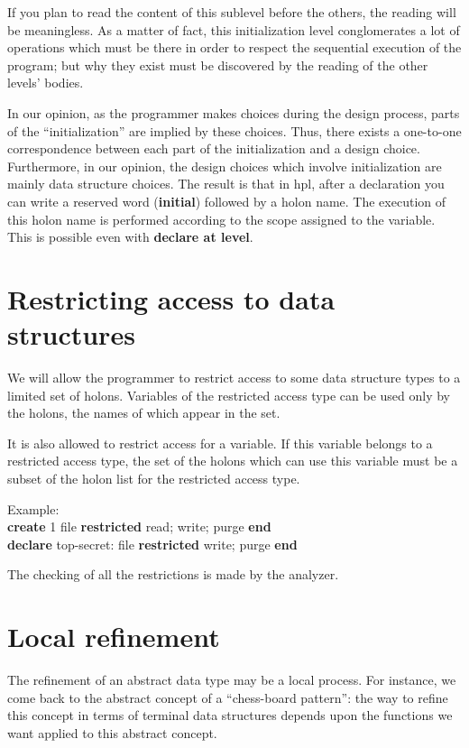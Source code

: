 \documentclass[openany,nobib]{tufte-book}
\newcommand{\kw}[1]{{\bf #1}}
\begin{document}
If you plan to read the content of this sublevel before the others, the reading
will be meaningless. As a matter of fact, this initialization level
conglomerates a lot of operations which must be there in order to respect the
sequential execution of the program; but why they exist must be discovered by
the reading of the other levels' bodies.

In our opinion, as the programmer makes choices during the design process,
parts of the ``initialization'' are implied by these choices. Thus, there
exists a one-to-one correspondence between each part of the initialization and
a design choice. Furthermore, in our opinion, the design choices which involve
initialization are mainly data structure choices. The result is that in {\sc
hpl}, after a declaration you can write a reserved word (\kw{initial})
followed by a holon name. The execution of this holon name is performed
according to the scope assigned to the variable. This is possible even with
\kw{declare at level}.

\section{Restricting access to data structures}
\label{sec:restricting}

We will allow the programmer to restrict access to some data structure types to
a limited set of holons. Variables of the restricted access type can be used
only by the holons, the names of which appear in the set.

It is also allowed to restrict access for a variable. If this variable belongs
to a restricted access type, the set of the holons which can use this variable
must be a subset of the holon list for the restricted access type.

Example:\\
\kw{create} 1 file \kw{restricted} read; write; purge \kw{end}\\
\kw{declare} top-secret: file \kw{restricted} write; purge \kw{end}

The checking of all the restrictions is made by the analyzer.

\section{Local refinement}
\label{sec:local-refinement}

The refinement of an abstract data type may be a local process. For instance,
we come back to the abstract concept of a ``chess-board pattern'': the way to
refine this concept in terms of terminal data structures depends upon the
functions we want applied to this abstract concept.
\end{document}
